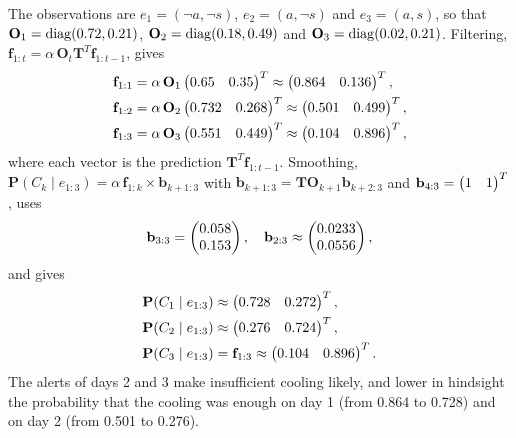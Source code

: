 \documentclass[11pt, a4paper]{exam}
\begin{document}
\begin{exercises}
\begin{parts}
    \begin{solution}
        The observations are $e_1 = (\lnot a, \lnot s)$, $e_2 = (a, \lnot s)$ and $e_3 = (a, s)$, so that $\mathbf{O}_1 = \operatorname{diag}(0.72, 0.21)$, $\mathbf{O}_2 = \operatorname{diag}(0.18, 0.49)$ and $\mathbf{O}_3 = \operatorname{diag}(0.02, 0.21)$. Filtering, $\mathbf{f}_{1:t} = \alpha \, \mathbf{O}_t \mathbf{T}^T \mathbf{f}_{1:t-1}$, gives
        \begin{align*}
            \mathbf{f}_{1:1} & = \alpha \, \mathbf{O}_1 \begin{pmatrix}0.65 & 0.35\end{pmatrix}^T \approx \begin{pmatrix}0.864 & 0.136\end{pmatrix}^T, \\
            \mathbf{f}_{1:2} & = \alpha \, \mathbf{O}_2 \begin{pmatrix}0.732 & 0.268\end{pmatrix}^T \approx \begin{pmatrix}0.501 & 0.499\end{pmatrix}^T, \\
            \mathbf{f}_{1:3} & = \alpha \, \mathbf{O}_3 \begin{pmatrix}0.551 & 0.449\end{pmatrix}^T \approx \begin{pmatrix}0.104 & 0.896\end{pmatrix}^T,
        \end{align*}
        where each vector is the prediction $\mathbf{T}^T \mathbf{f}_{1:t-1}$. Smoothing, $\mathbf{P}(C_k \mid e_{1:3}) = \alpha \, \mathbf{f}_{1:k} \times \mathbf{b}_{k+1:3}$ with $\mathbf{b}_{k+1:3} = \mathbf{T} \mathbf{O}_{k+1} \mathbf{b}_{k+2:3}$ and $\mathbf{b}_{4:3} = \begin{pmatrix}1 & 1\end{pmatrix}^T$, uses
        \[
            \mathbf{b}_{3:3} = \begin{pmatrix}0.058 \\ 0.153\end{pmatrix}, \quad \mathbf{b}_{2:3} \approx \begin{pmatrix}0.0233 \\ 0.0556\end{pmatrix},
        \]
        and gives
        \begin{align*}
            \mathbf{P}(C_1 \mid e_{1:3}) & \approx \begin{pmatrix}0.728 & 0.272\end{pmatrix}^T, \\
            \mathbf{P}(C_2 \mid e_{1:3}) & \approx \begin{pmatrix}0.276 & 0.724\end{pmatrix}^T, \\
            \mathbf{P}(C_3 \mid e_{1:3}) & = \mathbf{f}_{1:3} \approx \begin{pmatrix}0.104 & 0.896\end{pmatrix}^T.
        \end{align*}
        The alerts of days 2 and 3 make insufficient cooling likely, and lower in hindsight the probability that the cooling was enough on day 1 (from 0.864 to 0.728) and on day 2 (from 0.501 to 0.276).
    \end{solution}
\end{parts}

\end{exercises}
\end{document}

